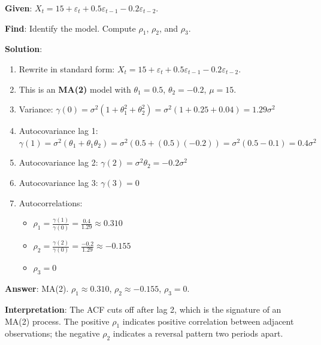 \documentclass[11pt,a4paper]{article}
\begin{document}
\begin{tcolorbox}[colback=blue!5!white,colframe=blue!75!black,title=\textbf{Worked Example 4: MA(2) Autocorrelation and Identification}]
\textbf{Given}: $X_t = 15 + \varepsilon_t + 0.5\varepsilon_{t-1} - 0.2\varepsilon_{t-2}$.

\textbf{Find}: Identify the model. Compute $\rho_1$, $\rho_2$, and $\rho_3$.

\textbf{Solution}:
\begin{enumerate}
    \item Rewrite in standard form: $X_t = 15 + \varepsilon_t + 0.5\varepsilon_{t-1} - 0.2\varepsilon_{t-2}$.
    \item This is an \textbf{MA(2)} model with $\theta_1 = 0.5$, $\theta_2 = -0.2$, $\mu = 15$.
    \item Variance: $\gamma(0) = \sigma^2(1 + \theta_1^2 + \theta_2^2) = \sigma^2(1 + 0.25 + 0.04) = 1.29\sigma^2$
    \item Autocovariance lag 1: $\gamma(1) = \sigma^2(\theta_1 + \theta_1\theta_2) = \sigma^2(0.5 + (0.5)(-0.2)) = \sigma^2(0.5 - 0.1) = 0.4\sigma^2$
    \item Autocovariance lag 2: $\gamma(2) = \sigma^2 \theta_2 = -0.2\sigma^2$
    \item Autocovariance lag 3: $\gamma(3) = 0$
    \item Autocorrelations:
    \begin{itemize}
        \item $\rho_1 = \frac{\gamma(1)}{\gamma(0)} = \frac{0.4}{1.29} \approx 0.310$
        \item $\rho_2 = \frac{\gamma(2)}{\gamma(0)} = \frac{-0.2}{1.29} \approx -0.155$
        \item $\rho_3 = 0$
    \end{itemize}
\end{enumerate}
\textbf{Answer}: MA(2). $\rho_1 \approx 0.310$, $\rho_2 \approx -0.155$, $\rho_3 = 0$.

\textbf{Interpretation}: The ACF cuts off after lag 2, which is the signature of an MA(2) process. The positive $\rho_1$ indicates positive correlation between adjacent observations; the negative $\rho_2$ indicates a reversal pattern two periods apart.
\end{tcolorbox}
\end{document}
